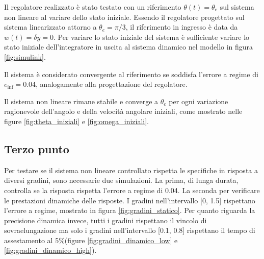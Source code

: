 \documentclass[a4paper, 11pt]{article}
\begin{document}
Il regolatore realizzato è stato testato con un riferimento $\theta(t)=\theta_e$ sul sistema non lineare al variare dello stato iniziale. Essendo il regolatore progettato sul sistema linearizzato attorno a $\theta_e=\pi/3$, il riferimento in ingresso è data da $w(t)=\delta y=0$. Per variare lo stato iniziale del sistema è sufficiente variare lo stato iniziale dell'integratore in uscita al sistema dinamico nel modello in figura \ref{fig:simulink}.

Il sistema è considerato convergente al riferimento se soddisfa l'errore a regime di $e_{\inf} = 0.04$, analogamente alla progettazione del regolatore.

Il sistema non lineare rimane stabile e converge a $\theta_e$ per ogni variazione ragionevole dell'angolo e della velocità angolare iniziali, come mostrato nelle figure \ref{fig:theta_iniziali} e \ref{fig:omega_iniziali}.



\subsection{Terzo punto}

Per testare se il sistema non lineare controllato rispetta le specifiche in risposta a diversi gradini, sono necessarie due simulazioni. La prima, di lunga durata, controlla se la risposta rispetta l'errore a regime di 0.04. La seconda per verificare le prestazioni dinamiche delle risposte.
I gradini nell'intervallo [0, 1.5] rispettano l'errore a regime, mostrato in figura \ref*{fig:gradini_statico}. Per quanto riguarda la precisione dinamica invece, tutti i gradini rispettano il vincolo di sovraelungazione ma solo i gradini nell'intervallo [0.1, 0.8] rispettano il tempo di assestamento al 5\%(figure \ref*{fig:gradini_dinamico_low} e \ref*{fig:gradini_dinamico_high}).
\end{document}
